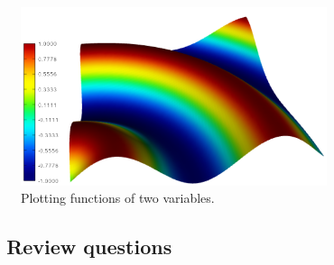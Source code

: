 \begin{figure}[!ht]
\begin{center}
\includegraphics[width=0.8\textwidth]{imgp/webgl.png}
\end{center}
\vspace{-2mm}
\caption{Plotting functions of two variables.}
\label{fig:webgl}
\end{figure}






\subsection{\ \ Review questions}

